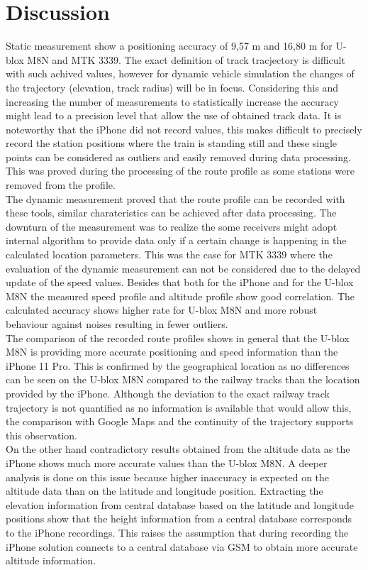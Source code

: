 \documentclass{article}
\begin{document}
	\section{Discussion}
		Static measurement show a positioning accuracy of 9,57 m and 16,80 m for U-blox M8N and MTK 3339. The exact definition of track tracjectory is difficult with such achived values, however for dynamic vehicle simulation the changes of the trajectory (elevation, track radius) will be in focus. Considering this and increasing the number of measurements to statistically increase the accuracy might lead to a precision level that allow the use of obtained track data. It is noteworthy that the iPhone did not record values, this makes difficult to precisely record the station positions where the train is standing still and these single points can be considered as outliers and easily removed during data processing. This was proved during the processing of the route profile as some stations were removed from the profile. \\
		The dynamic measurement proved that the route profile can be recorded with these tools, similar charateristics can be achieved after data processing. The downturn of the measurement was to realize the some receivers might adopt internal algorithm to provide data only if a certain change is happening in the calculated location parameters. This was the case for MTK 3339 where the evaluation of the dynamic measurement can not be considered due to the delayed update of the speed values. Besides that both for the iPhone and for the U-blox M8N the measured speed profile and altitude profile show good correlation. The calculated accuracy shows higher rate for U-blox M8N and more robust behaviour against noises resulting in fewer outliers. \\
		The comparison of the recorded route profiles shows in general that the U-blox M8N is providing more accurate positioning and speed information than the iPhone 11 Pro. This is confirmed by the geographical location as no differences can be seen on the U-blox M8N compared to the railway tracks than the location provided by the iPhone. Although the deviation to the exact railway track trajectory is not quantified as no information is available that would allow this, the comparison with Google Maps and the continuity of the trajectory supports this observation. \\
		On the other hand contradictory results obtained from the altitude data as the iPhone shows much more accurate values than the U-blox M8N. A deeper analysis is done on this issue because higher inaccuracy is expected on the altitude data than on the latitude and longitude position. Extracting the elevation information from central database based on the latitude and longitude positions show that the height information from a central database \cite{GPSVisualizerAssign} corresponds to the iPhone recordings. This raises the assumption that during recording the iPhone solution connects to a central database via GSM to obtain more accurate altitude information. \\ 
\end{document}
